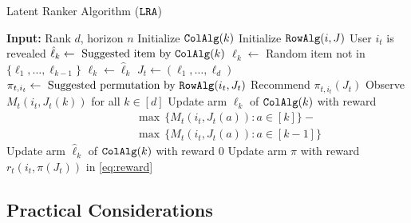 

\begin{algorithm}[t]
  \caption{Latent Ranker Algorithm (${\tt LRA}$)}
  \label{alg:latent ranker}
  \begin{algorithmic}[1]
    \State \textbf{Input:} Rank $d$, horizon $n$
    \State
      \State Initialize ${\tt ColAlg}(k)$
    \EndFor
      \State Initialize ${\tt RowAlg}(i, J)$
    \EndFor
    \State
      \State User $i_t$ is revealed
        \State $\hat{\ell}_k \gets \text{ Suggested item by } {\tt ColAlg}(k)$
          \State $\ell_k \gets$ Random item not in $\{\ell_1, \dots, \ell_{k - 1}\}$
        \Else
          \State $\ell_k \gets \hat{\ell}_k$
        \EndIf
      \EndFor
      \State $J_t \gets (\ell_1, \dots, \ell_d)$
      \State $\pi_{t, i_t} \gets \text{ Suggested permutation by } {\tt RowAlg}(i_t, J_t)$
      \State
      \State Recommend $\pi_{t, i_t}(J_t)$
      \State Observe $M_t(i_t, J_t(k))$ for all $k \in [d]$
      \State
          \State Update arm $\ell_k$ of ${\tt ColAlg}(k)$ with reward
          \begin{align*}
            \qquad \quad & \max \, \{M_t(i_t, J_t(a)): a \in [k]\} - {} \\
            & \max \, \{M_t(i_t, J_t(a)): a \in [k - 1]\}
          \end{align*}
        \Else
          \State Update arm $\hat{\ell}_k$ of ${\tt ColAlg}(k)$ with reward $0$
        \EndIf
      \EndFor
        \State Update arm $\pi$ with reward $r_t(i_t, \pi(J_t))$ in \eqref{eq:reward}
      \EndFor
    \EndFor
  \end{algorithmic}
\end{algorithm}


\subsection{Practical Considerations}
\label{sec:practical considerations}



